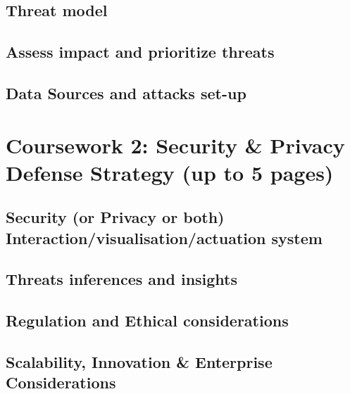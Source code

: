 \documentclass{article}
\begin{document}
\subsection{Threat model}
\subsection{Assess impact and prioritize threats}
\subsection{Data Sources and attacks set-up}

\section{Coursework 2: Security \& Privacy Defense Strategy (up to 5 pages)}
\subsection{Security (or Privacy or both) Interaction/visualisation/actuation system}
\subsection{Threats inferences and insights}
\subsection{Regulation and Ethical considerations}
\subsection{Scalability, Innovation \& Enterprise Considerations}

\vfill\pagebreak


% 
\end{document}
